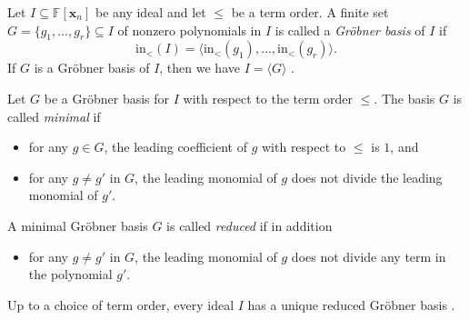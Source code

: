 \documentclass[10pt]{amsart}
\theoremstyle{definition}
\newcommand{\init}{{\mathrm {in}}}
\newcommand{\FF}{{\mathbb{F}}}
\newcommand{\xx}{{\mathbf {x}}}
\begin{document}
Let $I \subseteq \FF[\xx_n]$ be any ideal and let $\leq$ be a term order. 
A finite set $G = \{g_1, \dots, g_r\} \subseteq I$ 
of nonzero polynomials in $I$ is called a \emph{Gr\"obner basis} of $I$ if
\begin{equation}
\init_<(I) = \langle \init_<(g_1), \dots , \init_<(g_r) \rangle.
\end{equation}
If $G$ is a Gr\"obner basis of $I$, then we have $I = \langle G \rangle$ \cite[Cor. 6, p. 77]{CLO}.



Let $G$ be a Gr\"obner basis for $I$ with respect to the
term order $\leq$.  The basis $G$ is called \emph{minimal} if
\begin{itemize}
\item for any $g \in G$, the leading coefficient of $g$ with respect to $\leq$ is $1$, and
\item for any $g \neq g'$ in $G$, the leading monomial of $g$ does not divide the leading monomial of $g'$.
\end{itemize}
A minimal Gr\"obner basis $G$ is called \emph{reduced} if in addition 
\begin{itemize}
\item  for any $g \neq g'$ in $G$, the leading monomial of $g$ does not divide any term in the polynomial $g'$.
\end{itemize}
Up to a choice of term order,
every ideal $I$ has a unique reduced Gr\"obner basis \cite[Prop. 6, p. 92]{CLO}.
\end{document}
